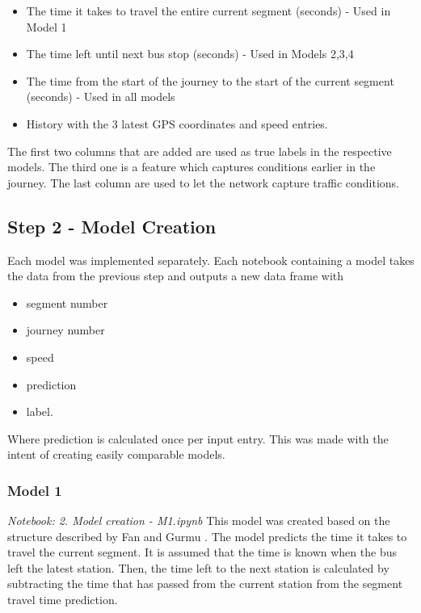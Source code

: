 \begin{itemize}
    \item The time it takes to travel the entire current segment (seconds) - Used in Model 1
    \item The time left until next bus stop (seconds) - Used in Models 2,3,4
    \item The time from the start of the journey to the start of the current segment (seconds) - Used in all models
    \item History with the 3 latest GPS coordinates and speed entries.
\end{itemize}

\noindent The first two columns that are added are used as true labels in the respective models. The third one is a feature which captures conditions earlier in the journey. The last column are used to let the network capture traffic conditions.

\subsection{Step 2 - Model Creation}
Each model was implemented separately. Each notebook containing a model takes the data from the previous step and outputs a new data frame with 

\begin{itemize}
    \item segment number
    \item journey number
    \item speed
    \item prediction
    \item label.
\end{itemize}

Where prediction is calculated once per input entry. This was made with the intent of creating easily comparable models.


\subsubsection{Model 1}
\textit{Notebook: 2. Model creation - M1.ipynb}
\newline
\noindent This model was created based on the structure described by Fan and Gurmu \cite{brazilANN}. The model predicts the time it takes to travel the current segment. It is assumed that the time is known when the bus left the latest station. Then, the time left to the next station is calculated by subtracting the time that has passed from the current station from the segment travel time prediction.

